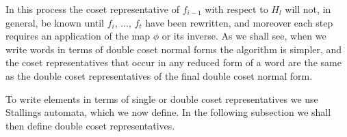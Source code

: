 \documentclass[a4paper,12pt]{article}
\numberwithin{equation}{section}
\numberwithin{figure}{section}
\begin{document}
In this process the coset representative of
$f_{i-1}$ with respect to $H_l$ will not, in general, be known
 until $f_i$, ..., $f_t$ have been rewritten, and moreover each step requires an 
application
of the map $\phi$ or its inverse. As we shall see, when we write words in terms of
double
coset normal forms the algorithm is simpler, and the coset representatives that
occur in any reduced  form of a word are the same as
the double coset representatives of the final double coset normal form.

To write elements in terms of single or double coset representatives we use 
Stallings automata,
which we now define. In the following subsection we shall then define double 
coset representatives.

\end{document}
